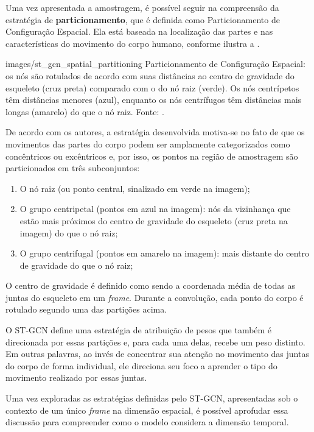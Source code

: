 Uma vez apresentada a amostragem, é possível seguir na compreensão da estratégia de \textbf{particionamento}, que é definida como Particionamento de Configuração Espacial. Ela está baseada na localização das partes e nas características do movimento do corpo humano, conforme ilustra a .

    {images/st_gcn_spatial_partitioning}
    {Particionamento de Configuração Espacial: os nós são rotulados de acordo com suas distâncias ao centro de gravidade do esqueleto (cruz preta) comparado com o do nó raiz (verde). Os nós centrípetos têm distâncias menores (azul), enquanto os nós centrífugos têm distâncias mais longas (amarelo) do que o nó raiz. Fonte: \cite[p. 5]{st-gcn-2018}.}

De acordo com os autores, a estratégia desenvolvida motiva-se no fato de que os movimentos das partes do corpo podem ser amplamente categorizados como concêntricos ou excêntricos e, por isso, os pontos na região de amostragem são particionados em três subconjuntos:

\begin{enumerate}
    \item O nó raiz (ou ponto central, sinalizado em verde na imagem);
    \item O grupo centripetal (pontos em azul na imagem): nós da vizinhança que estão mais próximos do centro de gravidade do esqueleto (cruz preta na imagem) do que o nó raiz;
    \item O grupo centrifugal (pontos em amarelo na imagem): mais distante do centro de gravidade do que o nó raiz;
\end{enumerate}

O centro de gravidade é definido como sendo a coordenada média de todas as juntas do esqueleto em um \textit{frame}. Durante a convolução, cada ponto do corpo é rotulado segundo uma das partições acima.

O ST-GCN define uma estratégia de atribuição de pesos que também é direcionada por essas partições e, para cada uma delas, recebe um peso distinto. Em outras palavras, ao invés de concentrar sua atenção no movimento das juntas do corpo de forma individual, ele direciona seu foco a aprender o tipo do movimento realizado por essas juntas.

Uma vez exploradas as estratégias definidas pelo ST-GCN, apresentadas sob o contexto de um único \textit{frame} na dimensão espacial, é possível aprofudar essa discussão para compreender como o modelo considera a dimensão temporal. 

